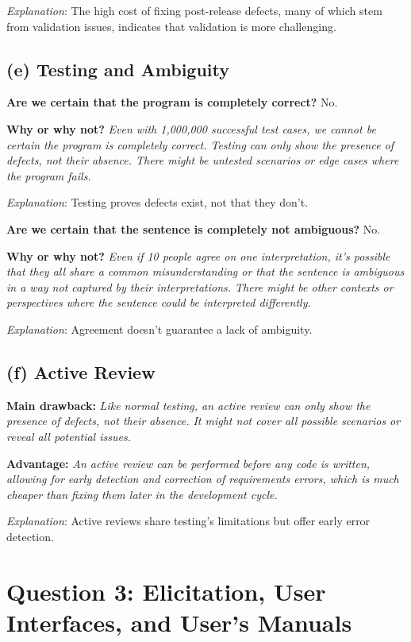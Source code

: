 \documentclass{article}
\begin{document}
\textit{Explanation}: The high cost of fixing post-release defects, many of which stem from validation issues, indicates that validation is more challenging.

\subsection*{(e) Testing and Ambiguity}

\textbf{Are we certain that the program is completely correct?} No.

\textbf{Why or why not?} \textit{Even with 1,000,000 successful test cases, we cannot be certain the program is completely correct. Testing can only show the presence of defects, not their absence. There might be untested scenarios or edge cases where the program fails.}

\textit{Explanation}: Testing proves defects exist, not that they don't.

\textbf{Are we certain that the sentence is completely not ambiguous?} No.

\textbf{Why or why not?} \textit{Even if 10 people agree on one interpretation, it's possible that they all share a common misunderstanding or that the sentence is ambiguous in a way not captured by their interpretations. There might be other contexts or perspectives where the sentence could be interpreted differently.}

\textit{Explanation}: Agreement doesn't guarantee a lack of ambiguity.

\subsection*{(f) Active Review}

\textbf{Main drawback:} \textit{Like normal testing, an active review can only show the presence of defects, not their absence. It might not cover all possible scenarios or reveal all potential issues.}

\textbf{Advantage:} \textit{An active review can be performed before any code is written, allowing for early detection and correction of requirements errors, which is much cheaper than fixing them later in the development cycle.}

\textit{Explanation}: Active reviews share testing's limitations but offer early error detection.

\section*{Question 3: Elicitation, User Interfaces, and User's Manuals}
\end{document}
